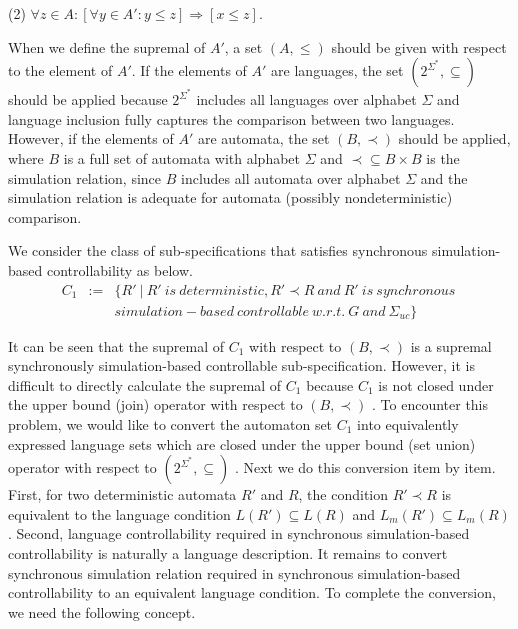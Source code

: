 \documentclass[preprint,authoryear,12pt]{elsarticle}
\begin{document}
(2) $\forall z \in A: [\forall y \in A': y \leq z] \Rightarrow [x
\leq z]$.

When we define the supremal of $A'$, a set $(A, \leq)$ should be
given with respect to the element of $A'$. If the elements of $A'$
are languages, the set $(2^{\Sigma^{*}}, \subseteq)$ should be
applied because $2^{\Sigma^{*}}$ includes all languages over
alphabet $\Sigma$ and language inclusion fully captures the
comparison between two languages. However, if the elements of $A'$
are automata, the set $(B, \prec)$ should be applied, where $B$ is
a full set of automata with alphabet $\Sigma$ and $\prec \subseteq
B \times B$ is the simulation relation, since $B$ includes all
automata over alphabet $\Sigma$ and the simulation relation is
adequate for automata (possibly nondeterministic) comparison.


We consider the class of sub-specifications that satisfies
synchronous simulation-based controllability as below.
\begin{eqnarray}
C_1 &:=& \{R' ~|~R'~ is ~deterministic, R' \prec R ~and ~R'~ is~ synchronous~ \nonumber\\
 & &  simulation-based ~controllable~ w.r.t.~ G ~and~
\Sigma_{uc}\} \nonumber
\end{eqnarray}

It can be seen that the supremal of $C_1$ with respect to $(B,
\prec)$ is a supremal synchronously simulation-based controllable
sub-specification. However, it is difficult to directly calculate
the supremal of $C_1$ because $C_1$ is not closed under the upper
bound (join) operator with respect to $(B, \prec)$
\citep{zhoubisimilarity2011}. To encounter this problem, we would
like to convert the automaton set $C_1$ into equivalently
expressed language sets which are closed under the upper bound
(set union) operator with respect to $(2^{\Sigma^{*}}, \subseteq)$
\citep{cassandras2008introduction}. Next we do this conversion
item by item. First, for two deterministic automata $R'$ and $R$,
the condition $R' \prec R$ is equivalent to the language condition
$L(R') \subseteq L(R)$ and $L_{m}(R') \subseteq L_{m}(R)$. Second,
language controllability required in synchronous simulation-based
controllability is naturally a language description. It remains to
convert synchronous simulation relation required in synchronous
simulation-based controllability to an equivalent language
condition. To complete the conversion, we need the following
concept.
\end{document}
